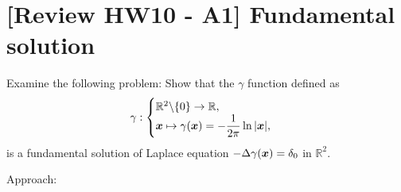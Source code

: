 \documentclass[12pt]{article}
\begin{document}
\section{[Review HW10 - A1] Fundamental solution}
\begin{example}
	Examine the following problem: Show that the $\gamma$ function defined as
	\begin{align}
		\gamma :
		\begin{cases}
			\mathbb{R}^2 \backslash \{ 0 \} \to \mathbb{R}, \\
			\displaystyle {\boldsymbol{\mathnormal x}} \mapsto \gamma({\boldsymbol{\mathnormal x}})= -\frac{1}{2\pi} \ln|{\boldsymbol{\mathnormal x}}|,
		\end{cases}
	\end{align}
	is a fundamental solution of Laplace equation
	$\displaystyle -\Delta \gamma({\boldsymbol{\mathnormal x}}) = \delta_{0}$ in $\mathbb{R}^2$.
\end{example}
Approach:
\end{document}
